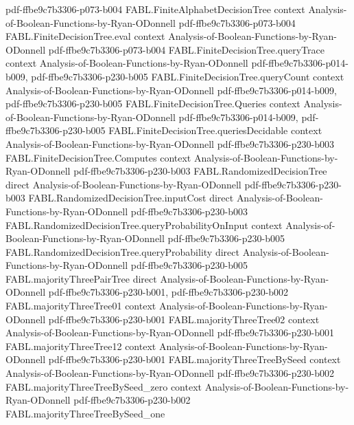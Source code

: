 \begin{theorem}
  {pdf-ffbe9c7b3306-p073-b004}
\proofstep
  {FABL.FiniteAlphabetDecisionTree}
  {context}
  {Analysis-of-Boolean-Functions-by-Ryan-ODonnell}
  {pdf-ffbe9c7b3306-p073-b004}
\proofstep
  {FABL.FiniteDecisionTree.eval}
  {context}
  {Analysis-of-Boolean-Functions-by-Ryan-ODonnell}
  {pdf-ffbe9c7b3306-p073-b004}
\proofstep
  {FABL.FiniteDecisionTree.queryTrace}
  {context}
  {Analysis-of-Boolean-Functions-by-Ryan-ODonnell}
  {pdf-ffbe9c7b3306-p014-b009,
    pdf-ffbe9c7b3306-p230-b005}
\proofstep
  {FABL.FiniteDecisionTree.queryCount}
  {context}
  {Analysis-of-Boolean-Functions-by-Ryan-ODonnell}
  {pdf-ffbe9c7b3306-p014-b009,
    pdf-ffbe9c7b3306-p230-b005}
\proofstep
  {FABL.FiniteDecisionTree.Queries}
  {context}
  {Analysis-of-Boolean-Functions-by-Ryan-ODonnell}
  {pdf-ffbe9c7b3306-p014-b009,
    pdf-ffbe9c7b3306-p230-b005}
\proofstep
  {FABL.FiniteDecisionTree.queriesDecidable}
  {context}
  {Analysis-of-Boolean-Functions-by-Ryan-ODonnell}
  {pdf-ffbe9c7b3306-p230-b003}
\proofstep
  {FABL.FiniteDecisionTree.Computes}
  {context}
  {Analysis-of-Boolean-Functions-by-Ryan-ODonnell}
  {pdf-ffbe9c7b3306-p230-b003}
\proofstep
  {FABL.RandomizedDecisionTree}
  {direct}
  {Analysis-of-Boolean-Functions-by-Ryan-ODonnell}
  {pdf-ffbe9c7b3306-p230-b003}
\proofstep
  {FABL.RandomizedDecisionTree.inputCost}
  {direct}
  {Analysis-of-Boolean-Functions-by-Ryan-ODonnell}
  {pdf-ffbe9c7b3306-p230-b003}
\proofstep
  {FABL.RandomizedDecisionTree.queryProbabilityOnInput}
  {context}
  {Analysis-of-Boolean-Functions-by-Ryan-ODonnell}
  {pdf-ffbe9c7b3306-p230-b005}
\proofstep
  {FABL.RandomizedDecisionTree.queryProbability}
  {direct}
  {Analysis-of-Boolean-Functions-by-Ryan-ODonnell}
  {pdf-ffbe9c7b3306-p230-b005}
\proofstep
  {FABL.majorityThreePairTree}
  {direct}
  {Analysis-of-Boolean-Functions-by-Ryan-ODonnell}
  {pdf-ffbe9c7b3306-p230-b001,
    pdf-ffbe9c7b3306-p230-b002}
\proofstep
  {FABL.majorityThreeTree01}
  {context}
  {Analysis-of-Boolean-Functions-by-Ryan-ODonnell}
  {pdf-ffbe9c7b3306-p230-b001}
\proofstep
  {FABL.majorityThreeTree02}
  {context}
  {Analysis-of-Boolean-Functions-by-Ryan-ODonnell}
  {pdf-ffbe9c7b3306-p230-b001}
\proofstep
  {FABL.majorityThreeTree12}
  {context}
  {Analysis-of-Boolean-Functions-by-Ryan-ODonnell}
  {pdf-ffbe9c7b3306-p230-b001}
\proofstep
  {FABL.majorityThreeTreeBySeed}
  {context}
  {Analysis-of-Boolean-Functions-by-Ryan-ODonnell}
  {pdf-ffbe9c7b3306-p230-b002}
\proofstep
  {FABL.majorityThreeTreeBySeed_zero}
  {context}
  {Analysis-of-Boolean-Functions-by-Ryan-ODonnell}
  {pdf-ffbe9c7b3306-p230-b002}
\proofstep
  {FABL.majorityThreeTreeBySeed_one}

\end{theorem}
